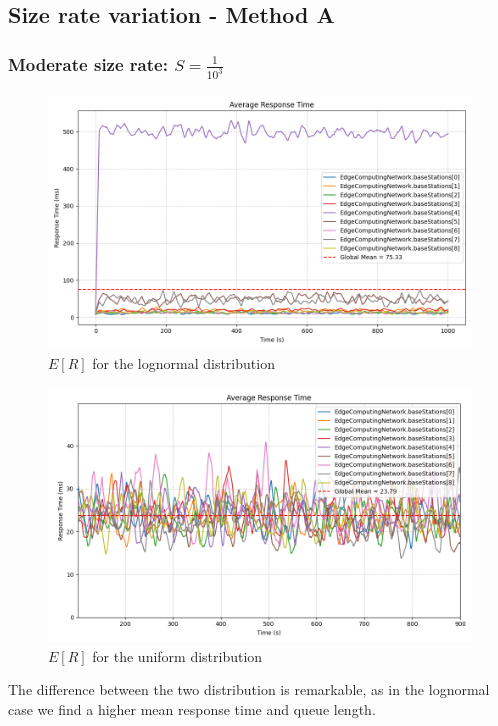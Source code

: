 \documentclass{report}
\begin{document}
\subsection{Size rate variation - Method A}
\subsubsection*{Moderate size rate: $S=\frac{1}{10^3}$}

\begin{figure}[H]
    \centering
    \includegraphics[width=\textwidth]{img/plots/log_1e3_A/resptime.png}
    \caption{$E[R]$ for the lognormal distribution}
\end{figure}

\begin{figure}[H]
    \centering
    \includegraphics[width=\textwidth]{img/plots/uni_1e3_A/resptime.png}
    \caption{$E[R]$ for the uniform distribution}
\end{figure}

The difference between the two distribution is remarkable, as in the lognormal case we find a higher mean response time and queue length.
\end{document}
